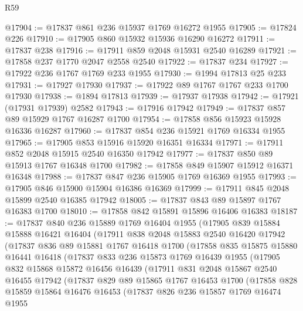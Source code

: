 \begin{lexlean}{R59}
\begin{coremodule}
@17904 := @17837 @861 @236 @15937 @1769 @16272 @1955
@17905 := @17824 @226
@17910 := @17905 @860 @15932 @15936 @16290 @16272
@17911 := @17837 @238
@17916 := @17911 @859 @2048 @15931 @2540 @16289
@17921 := @17858 @237 @1770 @2047 @2558 @2540
@17922 := @17837 @234
@17927 := @17922 @236 @1767 @1769 @233 @1955
@17930 := @1994 @17813 @25 @233
@17931 := @17927 @17930
@17937 := @17922 @89 @1767 @1767 @233 @1700 @17930
@17938 := @1894 @17813
@17939 := @17937 @17938
@17942 := @17921 (@17931 @17939) @2582
@17943 := @17916 @17942
@17949 := @17837 @857 @89 @15929 @1767 @16287 @1700
@17954 := @17858 @856 @15923 @15928 @16336 @16287
@17960 := @17837 @854 @236 @15921 @1769 @16334 @1955
@17965 := @17905 @853 @15916 @15920 @16351 @16334
@17971 := @17911 @852 @2048 @15915 @2540 @16350 @17942
@17977 := @17837 @850 @89 @15913 @1767 @16348 @1700
@17982 := @17858 @849 @15907 @15912 @16371 @16348
@17988 := @17837 @847 @236 @15905 @1769 @16369 @1955
@17993 := @17905 @846 @15900 @15904 @16386 @16369
@17999 := @17911 @845 @2048 @15899 @2540 @16385 @17942
@18005 := @17837 @843 @89 @15897 @1767 @16383 @1700
@18010 := @17858 @842 @15891 @15896 @16406 @16383
@18187 := @17837
    @840
    @236
    @15889
    @1769
    @16404
    @1955
    (@17905
      @839
      @15884
      @15888
      @16421
      @16404
      (@17911
        @838
        @2048
        @15883
        @2540
        @16420
        @17942
        (@17837
          @836
          @89
          @15881
          @1767
          @16418
          @1700
          (@17858
            @835
            @15875
            @15880
            @16441
            @16418
            (@17837
              @833
              @236
              @15873
              @1769
              @16439
              @1955
              (@17905
                @832
                @15868
                @15872
                @16456
                @16439
                (@17911
                  @831
                  @2048
                  @15867
                  @2540
                  @16455
                  @17942
                  (@17837
                    @829
                    @89
                    @15865
                    @1767
                    @16453
                    @1700
                    (@17858
                      @828
                      @15859
                      @15864
                      @16476
                      @16453
                      (@17837
                        @826
                        @236
                        @15857
                        @1769
                        @16474
                        @1955

\end{coremodule}
\end{lexlean}
